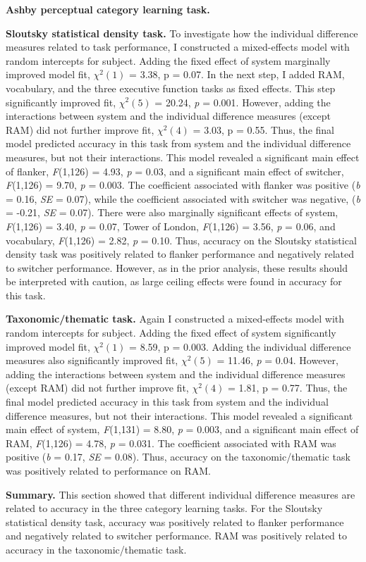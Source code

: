 \documentclass[../dissertation.tex]{subfiles}
\begin{document}
\textbf{Ashby perceptual category learning task.} \par 
\textbf{Sloutsky statistical density task.}  To investigate how the individual difference measures related to task performance, I constructed a mixed-effects model with random intercepts for subject. Adding the fixed effect of system marginally improved model fit,  $\chi^{2}(1)$ = 3.38, p = 0.07. In the next step, I added RAM, vocabulary, and the three executive function tasks as fixed effects. This step significantly improved fit, $\chi^{2}(5)$  = 20.24, \textit{p} = 0.001. However, adding the interactions between system and the individual difference measures (except RAM) did not further improve fit,  $\chi^{2}(4)$ = 3.03, p = 0.55. Thus, the final model predicted accuracy in this task from system and the individual difference measures, but not their interactions. This model revealed a significant main effect of flanker, \textit{F}(1,126) = 4.93, \textit{p} = 0.03, and a significant main effect of switcher, \textit{F}(1,126) = 9.70, \textit{p} = 0.003. The coefficient associated with flanker was positive (\textit{b} = 0.16, \textit{SE} = 0.07), while the coefficient associated with switcher was negative, (\textit{b} = -0.21, \textit{SE} = 0.07). There were also marginally significant effects of system, \textit{F}(1,126) = 3.40, \textit{p} = 0.07, Tower of London, \textit{F}(1,126) = 3.56, \textit{p} = 0.06, and vocabulary, \textit{F}(1,126) = 2.82, \textit{p} = 0.10. Thus, accuracy on the Sloutsky statistical density task was positively related to flanker performance and negatively related to switcher performance. However, as in the prior analysis, these results should be interpreted with caution, as large ceiling effects were found in accuracy for this task. \par
\textbf{Taxonomic/thematic task.}  Again I constructed a mixed-effects model with random intercepts for subject. Adding the fixed effect of system significantly improved model fit,  $\chi^{2}(1)$ = 8.59, p = 0.003. Adding the individual difference measures also significantly improved fit, $\chi^{2}(5)$  = 11.46, \textit{p} = 0.04. However, adding the interactions between system and the individual difference measures (except RAM) did not further improve fit,  $\chi^{2}(4)$ = 1.81, p = 0.77. Thus, the final model predicted accuracy in this task from system and the individual difference measures, but not their interactions. This model revealed a significant main effect of system, \textit{F}(1,131) = 8.80, \textit{p} = 0.003, and a significant main effect of RAM, \textit{F}(1,126) = 4.78, \textit{p} = 0.031. The coefficient associated with RAM was positive (\textit{b} = 0.17, \textit{SE} = 0.08). Thus, accuracy on the taxonomic/thematic task was positively related to performance on RAM. \par
\textbf{Summary.} This section showed that different individual difference measures are related to accuracy in the three category learning tasks. For the Sloutsky statistical density task, accuracy was positively related to flanker performance and negatively related to switcher performance. RAM was positively related to accuracy in the taxonomic/thematic task.
\end{document}
